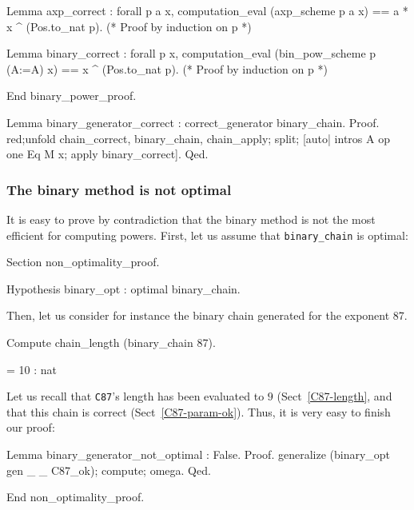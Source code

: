 \begin{Coqsrc}
Lemma axp_correct : forall p a x,
 computation_eval (axp_scheme p a x) == a *  x ^ (Pos.to_nat p).
(*  Proof by induction on p *)

Lemma binary_correct : 
  forall p x,
        computation_eval  (bin_pow_scheme p (A:=A) x) ==
        x ^ (Pos.to_nat p).
(* Proof by induction on p *)
 
End  binary_power_proof.
\end{Coqsrc}


\begin{Coqsrc}
Lemma binary_generator_correct : correct_generator binary_chain.
Proof.
  red;unfold chain_correct,  binary_chain, chain_apply;
  split; [auto| intros A op one Eq M x; apply binary_correct].
Qed.
\end{Coqsrc}


\subsubsection{The binary method is not optimal}

It is easy to prove by contradiction  that the binary method is not the most efficient 
for computing powers. 
    First, let us  assume that \texttt{binary\_chain} is optimal:

\begin{Coqsrc}
Section non_optimality_proof.

 Hypothesis binary_opt : optimal binary_chain.
\end{Coqsrc}

Then, let us consider for instance the binary chain generated for the exponent 87.

\begin{Coqsrc}
Compute chain_length (binary_chain 87).
\end{Coqsrc}

\begin{Coqanswer}
   = 10 : nat 
\end{Coqanswer}
  

Let us recall that \texttt{C87}'s length has been evaluated to $9$ (Sect~\ref{C87-length},
and that this chain is correct (Sect~\vref{C87-param-ok}). Thus, it is very easy
to finish our proof:

\begin{Coqsrc}
Lemma binary_generator_not_optimal : False.
Proof.
  generalize (binary_opt gen _  _ C87_ok); 
  compute; omega.
Qed. 

End non_optimality_proof.
\end{Coqsrc}

